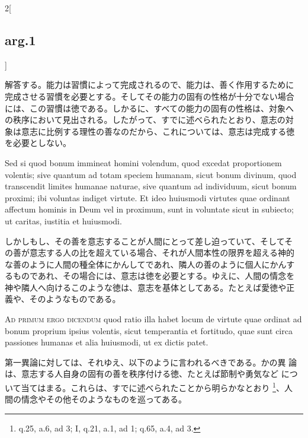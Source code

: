 \documentclass[paper=a4paper,fontsize=10pt,jafontsize=9pt,titlepage]{jlreq}
\begin{document}
\begin{paracol}{2}[\subsection{arg.1}]
\switchcolumn

解答する。能力は習慣によって完成されるので、能力は、善く作用するために
完成させる習慣を必要とする。そしてその能力の固有の性格が十分でない場合
には、この習慣は徳である。しかるに、すべての能力の固有の性格は、対象へ
の秩序において見出される。したがって、すでに述べられたとおり、意志の対
象は意志に比例する理性の善なのだから、これについては、意志は完成する徳
を必要としない。

\switchcolumn*

Sed si quod bonum immineat
homini volendum, quod excedat proportionem volentis; sive quantum ad
totam speciem humanam, sicut bonum divinum, quod transcendit limites
humanae naturae, sive quantum ad individuum, sicut bonum proximi; ibi
voluntas indiget virtute. Et ideo huiusmodi virtutes quae ordinant
affectum hominis in Deum vel in proximum, sunt in voluntate sicut in
subiecto; ut caritas, iustitia et huiusmodi.

\switchcolumn

しかしもし、その善を意志することが人間にとって差し迫っていて、そしてそ
の善が意志する人の比を超えている場合、それが人間本性の限界を超える神的
な善のように人間の種全体にかんしてであれ、隣人の善のように個人にかんす
るものであれ、その場合には、意志は徳を必要とする。ゆえに、人間の情念を
神や隣人へ向けるこのような徳は、意志を基体としてある。たとえば愛徳や正
義や、そのようなものである。

\switchcolumn*[\subsection{ad.1}]

{\scshape Ad primum ergo dicendum} quod ratio illa habet locum de
virtute quae ordinat ad bonum proprium ipsius volentis, sicut
temperantia et fortitudo, quae sunt circa passiones humanas et alia
huiusmodi, ut ex dictis patet.

\switchcolumn

第一異論に対しては、それゆえ、以下のように言われるべきである。かの異
 論は、意志する人自身の固有の善を秩序付ける徳、たとえば節制や勇気など
 について当てはまる。これらは、すでに述べられたことから明らかなとおり
 \footnote{q.25, a.6, ad 3; I, q.21, a.1, ad 1; q.65, a.4, ad 3.}、人
 間の情念やその他そのようなものを巡ってある。

\switchcolumn*[\subsection{ad.2}]


\end{paracol}
\end{document}
